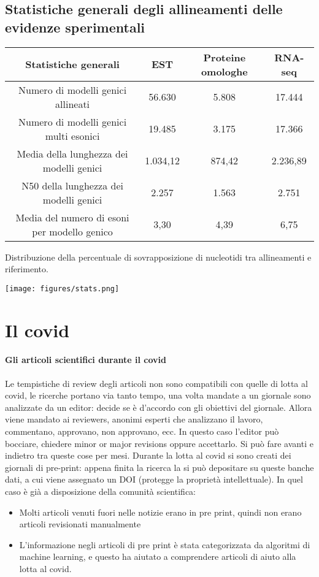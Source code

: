 \documentclass{article}
\begin{document}
\subsection{Statistiche generali degli allineamenti delle evidenze sperimentali}
\begin{center}
    \begin{tabular}{| c | c | c | c}
        \toprule
        \multicolumn{1}{p{2cm}}{\centering Statistiche generali} &
        \multicolumn{1}{p{2cm}}{\centering EST} &
        \multicolumn{1}{p{2cm}}{\centering Proteine omologhe} &
        \multicolumn{1}{p{2cm}}{\centering RNA-seq}\\
        \midrule
        Numero di modelli genici allineati & 56.630 &  5.808 & 17.444\\
        Numero di modelli genici multi esonici & 19.485 & 3.175 & 17.366\\
        Media della lunghezza dei modelli genici & 1.034,12 & 874,42 & 2.236,89\\
        N50 della lunghezza dei modelli genici & 2.257 & 1.563 & 2.751\\
        Media del numero di esoni per modello genico & 3,30 & 4,39 & 6,75\\
    \end{tabular}
\end{center}   
Distribuzione della percentuale di sovrapposizione di nucleotidi tra allineamenti e riferimento.
\begin{center}
    \texttt{[image: figures/stats.png]}
\end{center}

\section{Il covid}
\paragraph{Gli articoli scientifici durante il covid}
Le tempistiche di review degli articoli non sono compatibili con quelle di lotta al covid, le ricerche portano via tanto tempo, una volta mandate a un giornale sono analizzate da un editor: decide se è d'accordo con gli obiettivi del giornale. Allora viene mandato ai reviewers, anonimi esperti che analizzano il lavoro, commentano, approvano, non approvano, ecc. In questo caso l'editor può bocciare, chiedere minor or major revisions oppure accettarlo. Si può fare avanti e indietro tra queste cose per mesi.
Durante la lotta al covid si sono creati dei giornali di pre-print: appena finita la ricerca la si può depositare su queste banche dati, a cui viene assegnato un DOI (protegge la proprietà intellettuale). In quel caso è già a disposizione della comunità scientifica: 
\begin{itemize}
    \item Molti articoli venuti fuori nelle notizie erano in pre print, quindi non erano articoli revisionati manualmente
    \item L'informazione negli articoli di pre print è stata categorizzata da algoritmi di machine learning, e questo ha aiutato a comprendere articoli di aiuto alla lotta al covid.
\end{itemize}
\end{document}

